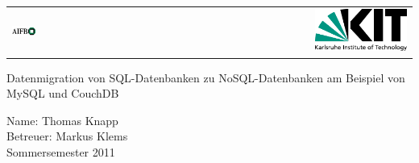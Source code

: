 \begin{titlepage}


\begin{center}
	\begin{tabularx}{\textwidth}{Xr}
	
	\includegraphics[width=0.3\textwidth]{figures/logoAIFB.png}
	 &
	 \includegraphics[width=0.3\textwidth]{figures/KITLogo_RGB.pdf}	
	 
	\end{tabularx}
\end{center}
	

\vspace{4cm}

\begin{center}
\Huge{Datenmigration von SQL-Datenbanken zu  NoSQL-Datenbanken am Beispiel von MySQL und CouchDB}
\end{center}

\vspace{3cm}

\begin{center}

\Large{
	Name: Thomas Knapp \\
	Betreuer: Markus Klems \\
	
	Sommersemester 2011
	}
	
\end{center}


\end{titlepage}